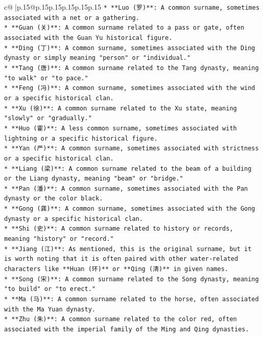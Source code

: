 \documentclass{article}
\begin{document}
{\begin{supertabular}{c@{$\;$}|p{.15\linewidth}@{}p{.15\linewidth}p{.15\linewidth}p{.15\linewidth}p{.15\linewidth}p{.15\linewidth}}
{{{\texttt{*   **Luo (罗)**: A common surname, sometimes associated with a net or a gathering.} \\
\texttt{*   **Guan (关)**: A common surname related to a pass or gate, often associated with the Guan Yu historical figure.} \\
\texttt{*   **Ding (丁)**: A common surname, sometimes associated with the Ding dynasty or simply meaning "person" or "individual."} \\
\texttt{*   **Tang (唐)**: A common surname related to the Tang dynasty, meaning "to walk" or "to pace."} \\
\texttt{*   **Feng (冯)**: A common surname, sometimes associated with the wind or a specific historical clan.} \\
\texttt{*   **Xu (徐)**: A common surname related to the Xu state, meaning "slowly" or "gradually."} \\
\texttt{*   **Huo (霍)**: A less common surname, sometimes associated with lightning or a specific historical figure.} \\
\texttt{*   **Yan (严)**: A common surname, sometimes associated with strictness or a specific historical clan.} \\
\texttt{*   **Liang (梁)**: A common surname related to the beam of a building or the Liang dynasty, meaning "beam" or "bridge."} \\
\texttt{*   **Pan (潘)**: A common surname, sometimes associated with the Pan dynasty or the color black.} \\
\texttt{*   **Gong (龚)**: A common surname, sometimes associated with the Gong dynasty or a specific historical clan.} \\
\texttt{*   **Shi (史)**: A common surname related to history or records, meaning "history" or "record."} \\
\texttt{*   **Jiang (江)**: As mentioned, this is the original surname, but it is worth noting that it is often paired with other water{-}related characters like **Huan (环)** or **Qing (清)** in given names.} \\
\texttt{*   **Song (宋)**: A common surname related to the Song dynasty, meaning "to build" or "to erect."} \\
\texttt{*   **Ma (马)**: A common surname related to the horse, often associated with the Ma Yuan dynasty.} \\
\texttt{*   **Zhu (朱)**: A common surname related to the color red, often associated with the imperial family of the Ming and Qing dynasties.} \\
}}}
\end{supertabular}}
\end{document}

